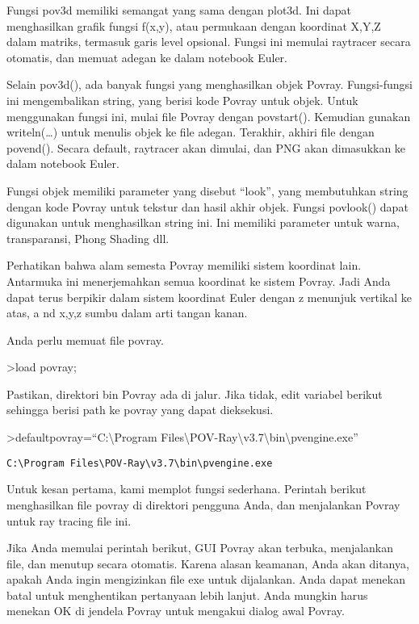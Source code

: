\documentclass[
]{book}
\begin{document}
Fungsi pov3d memiliki semangat yang sama dengan plot3d. Ini dapat menghasilkan grafik fungsi f(x,y), atau permukaan dengan koordinat X,Y,Z dalam matriks, termasuk garis level opsional. Fungsi ini memulai raytracer secara otomatis, dan memuat adegan ke dalam notebook Euler.

Selain pov3d(), ada banyak fungsi yang menghasilkan objek Povray. Fungsi-fungsi ini mengembalikan string, yang berisi kode Povray untuk objek. Untuk menggunakan fungsi ini, mulai file Povray dengan povstart(). Kemudian gunakan writeln(\ldots) untuk menulis objek ke file adegan. Terakhir, akhiri file dengan povend(). Secara default, raytracer akan dimulai, dan PNG akan dimasukkan ke dalam notebook Euler.

Fungsi objek memiliki parameter yang disebut ``look'', yang membutuhkan string dengan kode Povray untuk tekstur dan hasil akhir objek. Fungsi povlook() dapat digunakan untuk menghasilkan string ini. Ini memiliki parameter untuk warna, transparansi, Phong Shading dll.

Perhatikan bahwa alam semesta Povray memiliki sistem koordinat lain. Antarmuka ini menerjemahkan semua koordinat ke sistem Povray. Jadi Anda dapat terus berpikir dalam sistem koordinat Euler dengan z menunjuk vertikal ke atas, a nd x,y,z sumbu dalam arti tangan kanan.

Anda perlu memuat file povray.

\textgreater load povray;

Pastikan, direktori bin Povray ada di jalur. Jika tidak, edit variabel berikut sehingga berisi path ke povray yang dapat dieksekusi.

\textgreater defaultpovray=``C:\textbackslash Program Files\textbackslash POV-Ray\textbackslash v3.7\textbackslash bin\textbackslash pvengine.exe''

\begin{verbatim}
C:\Program Files\POV-Ray\v3.7\bin\pvengine.exe
\end{verbatim}

Untuk kesan pertama, kami memplot fungsi sederhana. Perintah berikut menghasilkan file povray di direktori pengguna Anda, dan menjalankan Povray untuk ray tracing file ini.

Jika Anda memulai perintah berikut, GUI Povray akan terbuka, menjalankan file, dan menutup secara otomatis. Karena alasan keamanan, Anda akan ditanya, apakah Anda ingin mengizinkan file exe untuk dijalankan. Anda dapat menekan batal untuk menghentikan pertanyaan lebih lanjut. Anda mungkin harus menekan OK di jendela Povray untuk mengakui dialog awal Povray.
\end{document}
